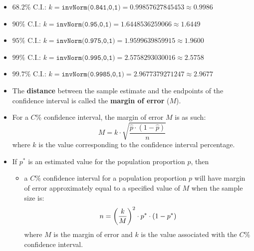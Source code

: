 \documentclass[12pt,a4paper,titlepage]{article}
\DeclarePairedDelimiter {\pars}  {  (      }     {  )      }
\begin{document}
\begin{SummaryBox}[title=Finding confidence intervals, breakable]
                \begin{SummaryExtensionBox}[title=\texorpdfstring{$\bm{k}$}{$k$} values for confidence intervals, list text=$k$ values for confidence intervals]
                    \begin{itemize}[leftmargin=*]
                        \item $68.2\%$ C.I.: $k = \texttt{invNorm(0.841,0,1)} = \num{0.99857627845453} \approx 0.9986$
                        \item $90\%$ C.I.: $k = \texttt{invNorm(0.95,0,1)} = \num{1.6448536259066} \approx 1.6449$
                        \item $95\%$ C.I.: $k = \texttt{invNorm(0.975,0,1)} = \num{1.9599639859915} \approx 1.9600$
                        \item $99\%$ C.I.: $k = \texttt{invNorm(0.995,0,1)} = \num{2.5758293030016} \approx 2.5758$
                        \item $99.7\%$ C.I.: $k = \texttt{invNorm(0.9985,0,1)} = \num{2.9677379271247} \approx 2.9677$
                    \end{itemize}
                \end{SummaryExtensionBox}
                
                \begin{SummaryExtensionBox}[title=Margin of error]
                    \begin{itemize}[leftmargin=*]
                        \item The \textbf{distance} between the sample estimate and the endpoints of the confidence interval is called the \textbf{margin of error} ($M$).
                        \item For a $C\%$ confidence interval, the margin of error $M$ is as such:
                        \[
                            M = k \cdot \sqrt{ \frac{\hat{p} \cdot (1 - \hat{p})}{n} }
                        \]
                        where $k$ is the value corresponding to the confidence interval percentage.
                        \item If $p^*$ is an estimated value for the population proportion $p$, then
                        \begin{itemize}[topsep=0pt]
                            \item a $C\%$ confidence interval for a population proportion $p$ will have margin of error approximately equal to a specified value of $M$ when the sample size is:
                            \[
                                n = \pars*{ \frac{k}{M} }^2 \cdot p^* \cdot (1 - p^*)
                            \]
                            where $M$ is the margin of error and $k$ is the value associated with the $C\%$ confidence interval.
                        \end{itemize}
                    \end{itemize}
                \end{SummaryExtensionBox}
            \end{SummaryBox}
            
\end{document}
